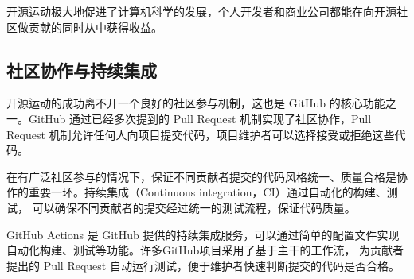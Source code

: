 \documentclass[../main.tex]{subfiles}
\begin{document}
开源运动极大地促进了计算机科学的发展，个人开发者和商业公司都能在向开源社区做贡献的同时从中获得收益。

\subsection{社区协作与持续集成}

开源运动的成功离不开一个良好的社区参与机制，这也是 GitHub 的核心功能之一。GitHub 通过已经多次提到的 Pull Request 机制实现了社区协作，Pull Request 机制允许任何人向项目提交代码，项目维护者可以选择接受或拒绝这些代码。

在有广泛社区参与的情况下，保证不同贡献者提交的代码风格统一、质量合格是协作的重要一环。持续集成（Continuous integration，CI）通过自动化的构建、测试，
可以确保不同贡献者的提交经过统一的测试流程，保证代码质量。

GitHub Actions 是 GitHub 提供的持续集成服务，可以通过简单的配置文件实现自动化构建、测试等功能。许多GitHub项目采用了基于主干的工作流，
为贡献者提出的 Pull Request 自动运行测试，便于维护者快速判断提交的代码是否合格。
\end{document}
